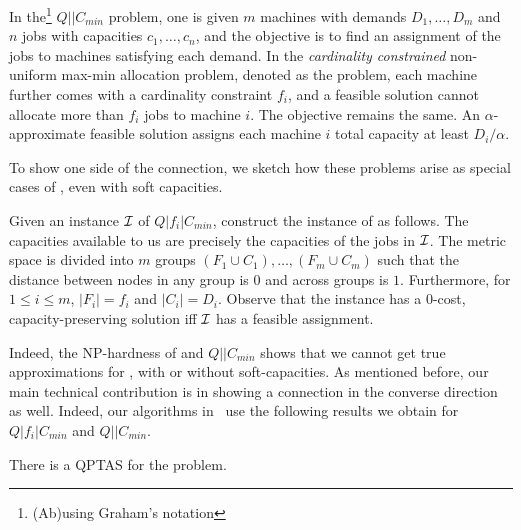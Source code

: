 \begin{definition}
In the\footnote{(Ab)using Graham's notation} $Q||C_{min}$ problem, one is given $m$ machines with demands $D_1,\ldots,D_m$ and $n$ jobs with capacities $c_1,\ldots,c_n$,
and the objective is to find an assignment of the jobs to machines satisfying each demand.
In the {\em cardinality constrained}  non-uniform max-min allocation problem, denoted as the \cckp problem, each machine further comes with a cardinality constraint $f_i$, and a feasible solution cannot allocate more than $f_i$ jobs to machine $i$. The objective remains the same. An $\alpha$-approximate feasible solution assigns each machine $i$  total capacity at least $ D_i/\alpha$.
\end{definition}
\noindent

To show one side of the connection, we sketch how these problems arise as special cases
of \mckc, even with soft capacities.
\begin{remark}\label{frem:cckp}
	Given an instance ${\cal I}$ of $Q|f_i|C_{min}$, construct the instance of \mckc as follows. The capacities available to us are precisely the capacities of the jobs in ${\cal I}$. The metric space is divided into $m$ groups $(F_1\cup C_1),\ldots,(F_m\cup C_m)$ such that the distance between nodes in any group is $0$ and across groups is $1$. Furthermore, for $1\leq i\leq m$, $|F_i| = f_i$ and $|C_i| = D_i$. Observe that the \mckc instance has a $0$-cost, capacity-preserving solution iff ${\cal I}$ has a feasible assignment.
\end{remark}

Indeed, the NP-hardness of \cckp and $Q || C_{min}$ shows that we cannot get true approximations for \mckc, with or without soft-capacities.
As mentioned before, our main technical contribution is in showing a connection in the converse direction as well. Indeed, our algorithms in~ use the following results we obtain for $Q|f_i|C_{min}$ and $Q||C_{min}$.

\begin{theorem}\label{fthm:q}
	There is a QPTAS for the \cckp problem.
\end{theorem}


